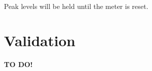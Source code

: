 Peak levels will be held until the meter is reset.

\chapter{Validation}
\label{chap:validation}

\textbf{TO DO!}







